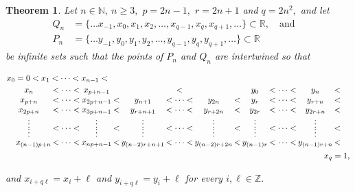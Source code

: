 \documentclass[a4paper, 11pt]{amsart}
\numberwithin{equation}{section}
\newtheorem{theorem}{Theorem}[section]
\theoremstyle{customnumberedtheorem}
\theoremstyle{definitionwithbfnote}
\newcommand{\N}{\ensuremath{\mathbb{N}}}
\newcommand{\Z}{\ensuremath{\mathbb{Z}}}
\newcommand{\R}{\ensuremath{\mathbb{R}}}
\newcommand{\andq}[1][and]{\ensuremath{\quad\text{#1}\quad}}
\begin{document}
\begin{theorem}\label{theoremexamplemontevideucircle}
Let $n \in \N,\ n\ge 3,$ $p=2n-1,$ $r=2n+1$ and $q=2n^2,$ and let
\begin{align*}
Q_n &= \{\dots x_{-1}, x_0, x_1, x_2, \dots, x_{q-1}, x_{q}, x_{q+1}, \dots\} \subset \R,\andq \\
P_n &= \{\dots y_{-1}, y_0, y_1, y_2, \dots, y_{q-1}, y_{q}, y_{q+1}, \dots\} \subset \R
\end{align*}
be infinite sets such that the points of $P_n$ and $Q_n$
are intertwined  so that
\begin{tiny}
\[\def\sseepp{< \cdots <} \arraycolsep=1pt
 \begin{array}{cccccccccccl}
 \multicolumn{3}{l}{x_0 = 0< x_1 \sseepp x_{n-1} <}  & & &         &               &   &            &         &              &   \\[0.5ex]
    x_{n}    & \sseepp & x_{p+n-1}  &   &                &    <    &               &   & y_0        & \sseepp & y_{n}        & < \\
    x_{p+n}  & \sseepp & x_{2p+n-1} & < & y_{n+1}        & \sseepp & y_{2n}        & < & y_{r}      & \sseepp & y_{r+n}      & < \\
    x_{2p+n} & \sseepp & x_{3p+n-1} & < & y_{r+n+1}      & \sseepp & y_{r+2n}      & < & y_{2r}     & \sseepp & y_{2r+n}     & < \\
     \vdots  &         & \vdots     &   & \vdots         &         & \vdots        &   & \vdots     &         & \vdots       &   \\[-2ex]
             & \sseepp &            & < &                & \sseepp &               & < &            & \sseepp &              & < \\[-2.6ex]
     \vdots  &         & \vdots     &   & \vdots         &         & \vdots        &   & \vdots     &         & \vdots       &   \\[-0.5ex]
\hspace*{1.1em}x_{(n-1)p+n} & \sseepp & x_{np+n-1} & < & y_{(n-2)r+n+1} & \sseepp & y_{(n-2)r+2n} & < & y_{(n-1)r} & \sseepp & y_{(n-1)r+n} & < \hspace*{1.1em}\\[1ex]
             &         &            &   &                &         &               &   &            &         & \multicolumn{2}{r}{x_q = 1,}
\end{array}
\]
\end{tiny}
and $x_{i + q\ell} = x_i + \ell$ and $y_{i + q\ell} = y_i + \ell$
for every $i,\ell \in \Z.$


\end{theorem}
\end{document}
